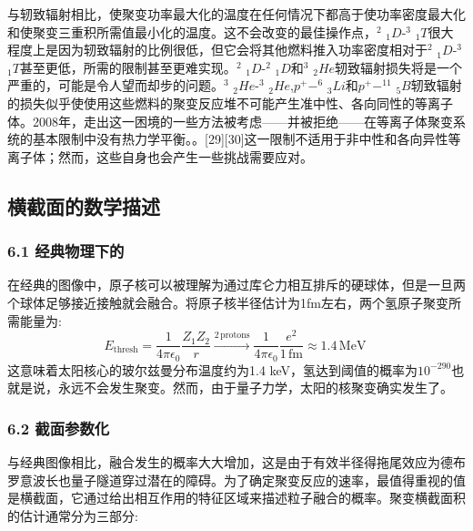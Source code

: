 与轫致辐射相比，使聚变功率最大化的温度在任何情况下都高于使功率密度最大化和使聚变三重积所需值最小化的温度。这不会改变的最佳操作点，$^{2}$ $_{1}D$-$^{3}$ $_{1}T$很大程度上是因为轫致辐射的比例很低，但它会将其他燃料推入功率密度相对于$^{2}$ $_{1}D$-$^{3}$ $_{1}T$甚至更低，所需的限制甚至更难实现。$^{2}$ $_{1}D$-$^{2}$ $_{1}D$和$^{3}$ $_{2}He$轫致辐射损失将是一个严重的，可能是令人望而却步的问题。$^{3}$ $_{2}He$-$^{3}$ $_{2}He$,$p^{+}-^{6}$ $_{3}Li$和$p^{+}-^{11}$ $_{5}B$轫致辐射的损失似乎使使用这些燃料的聚变反应堆不可能产生准中性、各向同性的等离子体。2008年，走出这一困境的一些方法被考虑——并被拒绝——在等离子体聚变系统的基本限制中没有热力学平衡。。[29][30]这一限制不适用于非中性和各向异性等离子体；然而，这些自身也会产生一些挑战需要应对。

\subsection{ 横截面的数学描述}
\subsubsection{6.1 经典物理下的}
在经典的图像中，原子核可以被理解为通过库仑力相互排斥的硬球体，但是一旦两个球体足够接近接触就会融合。将原子核半径估计为1fm左右，两个氢原子聚变所需能量为:
$$E_{\text{thresh}} = \frac{1}{4\pi \epsilon_0} \frac{Z_1 Z_2}{r} \xrightarrow{2 \, \text{protons}} \frac{1}{4\pi \epsilon_0} \frac{e^2}{1 \, \text{fm}} \approx 1.4 \, \text{MeV}~$$
这意味着太阳核心的玻尔兹曼分布温度约为1.4 keV，氢达到阈值的概率为$10^{-290}$也就是说，永远不会发生聚变。然而，由于量子力学，太阳的核聚变确实发生了。
\subsubsection{6.2 截面参数化}
与经典图像相比，融合发生的概率大大增加，这是由于有效半径得拖尾效应为德布罗意波长也量子隧道穿过潜在的障碍。为了确定聚变反应的速率，最值得重视的值是横截面，它通过给出相互作用的特征区域来描述粒子融合的概率。聚变横截面积的估计通常分为三部分: